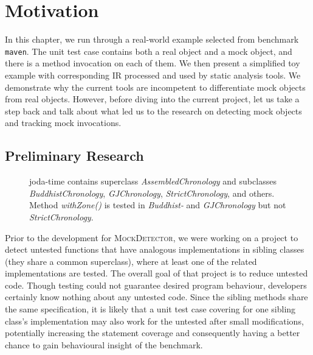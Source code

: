 \chapter{Motivation}
\label{chap:motivation}

In this chapter, we run through a real-world example selected from benchmark \texttt{maven}. The unit test case contains both a real object and a mock object, and there is a method invocation on each of them. We then present a simplified toy example with corresponding IR processed and used by static analysis tools. We demonstrate why the current tools are incompetent to differentiate mock objects from real objects. However, before diving into the current project, let us take a step back and talk about what led us to the research on detecting mock objects and tracking mock invocations.

\section{Preliminary Research}
\label{sec:preliminary}

\begin{figure}[h]
	\centering
	
	\caption[Caption for SiblingClass untested method.]{joda-time contains superclass \textit{AssembledChronology} and subclasses \textit{BuddhistChronology}, \textit{GJChronology}, \textit{StrictChronology}, and others. Method \textit{withZone()} is tested in \textit{Buddhist-} and \textit{GJChronology} but not \textit{StrictChronology}.\footnotemark}
	\label{fig:hierarchyView}
\end{figure}


Prior to the development for \textsc{MockDetector}, we were working on a project to detect untested functions that have analogous implementations in sibling classes (they share a common superclass), where at least one of the related implementations are tested. The overall goal of that project is to reduce untested code. Though testing could not guarantee desired program behaviour, developers certainly know nothing about any untested code. Since the sibling methods share the same specification, it is likely that a unit test case covering for one sibling class's implementation may also work for the untested after small modifications, potentially increasing the statement coverage and consequently having a better chance to gain behavioural insight of the benchmark.

